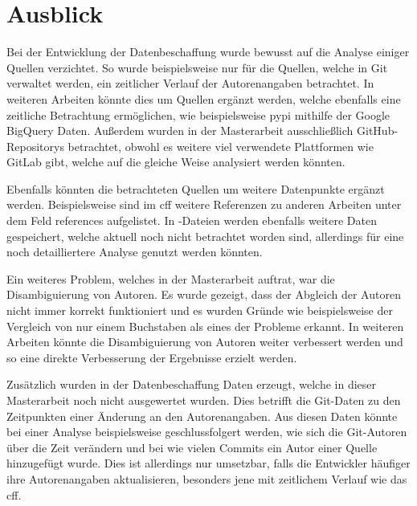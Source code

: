 \section{Ausblick}
\label{sec:ausblick}
Bei der Entwicklung der Datenbeschaffung wurde bewusst auf die Analyse einiger Quellen verzichtet.
So wurde beispielsweise nur für die Quellen, welche in Git verwaltet werden, ein zeitlicher Verlauf der Autorenangaben betrachtet.
In weiteren Arbeiten könnte dies um Quellen ergänzt werden, welche ebenfalls eine zeitliche Betrachtung ermöglichen, wie beispielsweise \gls{pypi} mithilfe der Google BigQuery Daten.
Außerdem wurden in der Masterarbeit ausschließlich GitHub-Repositorys betrachtet, obwohl es weitere viel verwendete Plattformen wie GitLab gibt, welche auf die gleiche Weise analysiert werden könnten.

Ebenfalls könnten die betrachteten Quellen um weitere Datenpunkte ergänzt werden.
Beispielsweise sind im \gls{cff} weitere Referenzen zu anderen Arbeiten unter dem Feld \glqq references\grqq{} aufgelistet.
In -Dateien werden ebenfalls weitere Daten gespeichert, welche aktuell noch nicht betrachtet worden sind, allerdings für eine noch detailliertere Analyse genutzt werden könnten.

Ein weiteres Problem, welches in der Masterarbeit auftrat, war die Disambiguierung von Autoren.
Es wurde gezeigt, dass der Abgleich der Autoren nicht immer korrekt funktioniert und es wurden Gründe wie beispielsweise der Vergleich von nur einem Buchstaben als eines der Probleme erkannt.
In weiteren Arbeiten könnte die Disambiguierung von Autoren weiter verbessert werden und so eine direkte Verbesserung der Ergebnisse erzielt werden.

Zusätzlich wurden in der Datenbeschaffung Daten erzeugt, welche in dieser Masterarbeit noch nicht ausgewertet wurden.
Dies betrifft die Git-Daten zu den Zeitpunkten einer Änderung an den Autorenangaben.
Aus diesen Daten könnte bei einer Analyse beispielsweise geschlussfolgert werden, wie sich die Git-Autoren über die Zeit verändern und bei wie vielen Commits ein Autor einer Quelle hinzugefügt wurde.
Dies ist allerdings nur umsetzbar, falls die Entwickler häufiger ihre Autorenangaben aktualisieren, besonders jene mit zeitlichem Verlauf wie das \gls{cff}.
